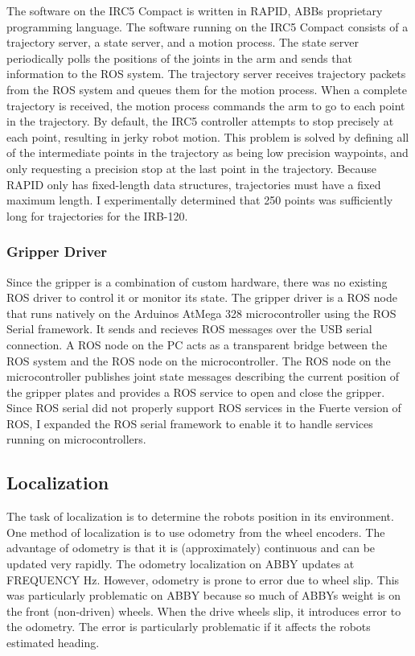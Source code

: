 \documentclass{article}
\begin{document}
The software on the IRC5 Compact is written in RAPID, ABB{\textquotesingle}s proprietary programming language. The software running on the IRC5 Compact consists of a trajectory server, a state server, and a motion process. The state server periodically polls the positions of the joints in the arm and sends that information to the ROS system. The trajectory server receives trajectory packets from the ROS system and queues them for the motion process. When a complete trajectory is received, the motion process commands the arm to go to each point in the trajectory. By default, the IRC5 controller attempts to stop precisely at each point, resulting in jerky robot motion. This problem is solved by defining all of the intermediate points in the trajectory as being low precision waypoints, and only requesting a precision stop at the last point in the trajectory. Because RAPID only has fixed-length data structures, trajectories must have a fixed maximum length. I experimentally determined that 250 points was sufficiently long for trajectories for the IRB-120.

\subsubsection{Gripper Driver}
Since the gripper is a combination of custom hardware, there was no existing ROS driver to control it or monitor its state. The gripper driver is a ROS node that runs natively on the Arduino{\textquotesingle}s AtMega 328 microcontroller using the ROS Serial framework. It sends and recieves ROS messages over the USB serial connection. A ROS node on the PC acts as a transparent bridge between the ROS system and the ROS node on the microcontroller. The ROS node on the microcontroller publishes joint state messages describing the current position of the gripper plates and provides a ROS service to open and close the gripper. Since ROS serial did not properly support ROS services in the Fuerte version of ROS, I expanded the ROS serial framework to enable it to handle services running on microcontrollers.

\subsection[Localization]{Localization}
The task of localization is to determine the robot{\textquotesingle}s position in its environment. One method of localization is to use odometry from the wheel encoders. The advantage of odometry is that it is (approximately) continuous and can be updated very rapidly. The odometry localization on ABBY updates at FREQUENCY Hz. However, odometry is prone to error due to wheel slip. This was particularly problematic on ABBY because so much of ABBY{\textquotesingle}s weight is on the front (non-driven) wheels. When the drive wheels slip, it introduces error to the odometry. The error is particularly problematic if it affects the robot{\textquotesingle}s estimated heading.
\end{document}
